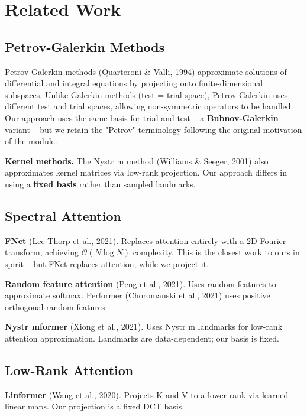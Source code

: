 
\section{Related Work}

\subsection{Petrov-Galerkin Methods}

Petrov-Galerkin methods (Quarteroni \& Valli, 1994) approximate solutions of 
differential and integral equations by projecting onto finite-dimensional 
subspaces. Unlike Galerkin methods (test = trial space), Petrov-Galerkin 
uses different test and trial spaces, allowing non-symmetric operators to be 
handled. Our approach uses the same basis for trial and test -- a \textbf{Bubnov-Galerkin} 
variant -- but we retain the "Petrov" terminology following the original 
motivation of the module.

\textbf{Kernel methods.} The Nystr m method (Williams \& Seeger, 2001) also 
approximates kernel matrices via low-rank projection. Our approach differs 
in using a \textbf{fixed basis} rather than sampled landmarks.

\subsection{Spectral Attention}

\textbf{FNet} (Lee-Thorp et al., 2021). Replaces attention entirely with a 2D 
Fourier transform, achieving $\mathcal{O}(N \log N)$ complexity. This is the 
closest work to ours in spirit -- but FNet replaces attention, while we 
project it.

\textbf{Random feature attention} (Peng et al., 2021). Uses random features to 
approximate softmax. Performer (Choromanski et al., 2021) uses positive 
orthogonal random features.

\textbf{Nystr mformer} (Xiong et al., 2021). Uses Nystr m landmarks for low-rank 
attention approximation. Landmarks are data-dependent; our basis is fixed.

\subsection{Low-Rank Attention}

\textbf{Linformer} (Wang et al., 2020). Projects K and V to a lower rank via 
learned linear maps. Our projection is a fixed DCT basis.

